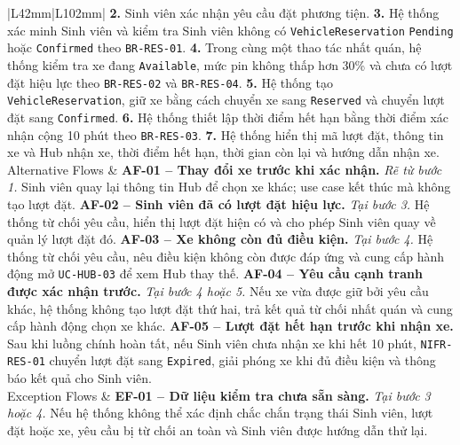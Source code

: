 \begin{longtable}{|L{42mm}|L{102mm}|}
    \textbf{2.} Sinh viên xác nhận yêu cầu đặt phương tiện.\newline
    \textbf{3.} Hệ thống xác minh Sinh viên và kiểm tra Sinh viên không có \texttt{VehicleReservation} \texttt{Pending} hoặc \texttt{Confirmed} theo \texttt{BR-RES-01}.\newline
    \textbf{4.} Trong cùng một thao tác nhất quán, hệ thống kiểm tra xe đang \texttt{Available}, mức pin không thấp hơn 30\% và chưa có lượt đặt hiệu lực theo \texttt{BR-RES-02} và \texttt{BR-RES-04}.\newline
    \textbf{5.} Hệ thống tạo \texttt{VehicleReservation}, giữ xe bằng cách chuyển xe sang \texttt{Reserved} và chuyển lượt đặt sang \texttt{Confirmed}.\newline
    \textbf{6.} Hệ thống thiết lập thời điểm hết hạn bằng thời điểm xác nhận cộng 10 phút theo \texttt{BR-RES-03}.\newline
    \textbf{7.} Hệ thống hiển thị mã lượt đặt, thông tin xe và Hub nhận xe, thời điểm hết hạn, thời gian còn lại và hướng dẫn nhận xe.\\\hline
  Alternative Flows &
    \textbf{AF-01 -- Thay đổi xe trước khi xác nhận.} \textit{Rẽ từ bước 1.} Sinh viên quay lại thông tin Hub để chọn xe khác; use case kết thúc mà không tạo lượt đặt.\newline
    \textbf{AF-02 -- Sinh viên đã có lượt đặt hiệu lực.} \textit{Tại bước 3.} Hệ thống từ chối yêu cầu, hiển thị lượt đặt hiện có và cho phép Sinh viên quay về quản lý lượt đặt đó.\newline
    \textbf{AF-03 -- Xe không còn đủ điều kiện.} \textit{Tại bước 4.} Hệ thống từ chối yêu cầu, nêu điều kiện không còn được đáp ứng và cung cấp hành động mở \texttt{UC-HUB-03} để xem Hub thay thế.\newline
    \textbf{AF-04 -- Yêu cầu cạnh tranh được xác nhận trước.} \textit{Tại bước 4 hoặc 5.} Nếu xe vừa được giữ bởi yêu cầu khác, hệ thống không tạo lượt đặt thứ hai, trả kết quả từ chối nhất quán và cung cấp hành động chọn xe khác.\newline
    \textbf{AF-05 -- Lượt đặt hết hạn trước khi nhận xe.} Sau khi luồng chính hoàn tất, nếu Sinh viên chưa nhận xe khi hết 10 phút, \texttt{NIFR-RES-01} chuyển lượt đặt sang \texttt{Expired}, giải phóng xe khi đủ điều kiện và thông báo kết quả cho Sinh viên.\\\hline
  Exception Flows &
    \textbf{EF-01 -- Dữ liệu kiểm tra chưa sẵn sàng.} \textit{Tại bước 3 hoặc 4.} Nếu hệ thống không thể xác định chắc chắn trạng thái Sinh viên, lượt đặt hoặc xe, yêu cầu bị từ chối an toàn và Sinh viên được hướng dẫn thử lại.\newline

\end{longtable}
